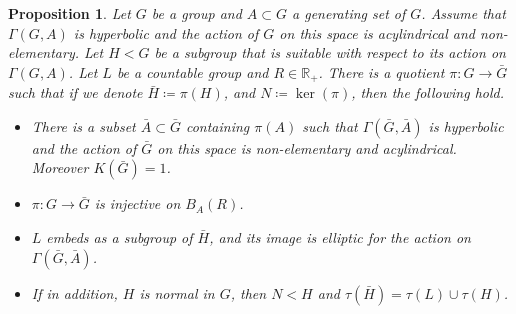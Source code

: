 \documentclass[JEP,XML,SOM,Unicode]{cedram}
\newtheorem{proposition}[theorem]{Proposition}
\theoremstyle{definition}
\begin{document}
\begin{proposition}
\label{res: quotient with prescribed torsion}
Let $G$ be a group and $A \subset G$ a generating set of $G$.
Assume that $\Gamma(G,A)$ is hyperbolic and the action of $G$ on this space is acylindrical and non-elementary.
Let $H < G$ be a subgroup that is suitable with respect to its action on $\Gamma(G,A)$.
Let $L$ be a countable group and $R \in \mathbb R_+$.
There is a quotient $\pi : G \to \bar G$ such that if we denote $\bar H \coloneqq \pi(H)$, and $N \coloneqq \ker(\pi)$, then the following hold.
\begin{itemize}
\item There is a subset $\bar A \subset \bar G$ containing $\pi(A)$ such that $\Gamma(\bar G, \bar A)$ is hyperbolic and the action of $\bar G$ on this space is non-elementary and acylindrical. Moreover $K(\bar G) = 1$.
\item $\pi : G \to \bar G$ is injective on $B_A(R)$.
\item $L$ embeds as a subgroup of $\bar H$, and its image is elliptic for the action on $\Gamma(\bar G, \bar A)$.
\item If in addition, $H$ is normal in $G$, then $N < H$ and $\tau(\bar H) = \tau(L) \cup \tau(H)$.
\end{itemize} 
\end{proposition}
\end{document}

